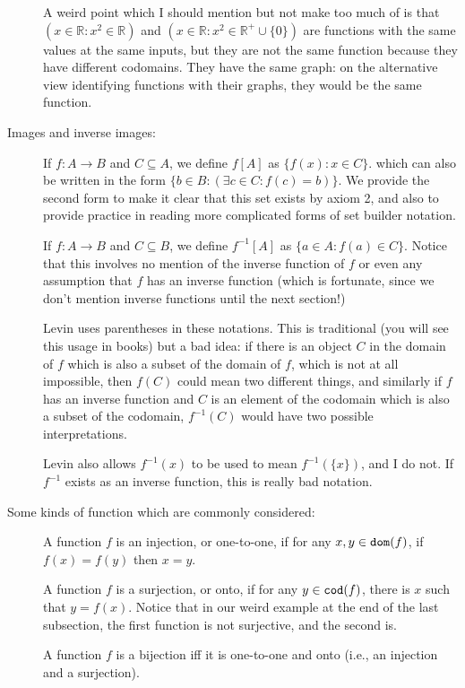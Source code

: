 \documentclass[12pt]{article}
\begin{document}
\begin{description}
A weird point which I should mention but not make too much of is that $(x \in {\mathbb R}:x^2 \in \mathbb R)$ and $(x \in {\mathbb R}:x^2 \in \mathbb R^+ \cup \{0\})$ are functions with the same values at the same inputs, but they are not the same function because they have different codomains.  They have the same graph:  on the alternative view identifying functions with their graphs, they would be the same function.


\item[Images and inverse images:]

If $f:A \rightarrow B$ and $C \subseteq A$, we define $f[A]$ as $\{f(x):x \in C\}$. which can also be written in the form $\{b \in B:(\exists c \in C:f(c)=b)\}$.  We provide the second form to make it clear
that this set exists by axiom 2, and also to provide practice in reading more complicated forms of set builder notation.

If $f:A \rightarrow B$ and $C \subseteq B$, we define $f^{-1}[A]$ as $\{a \in A:f(a) \in C\}$.  Notice that this involves no mention of the inverse function of $f$ or even any assumption that $f$ has an inverse function (which is fortunate, since we don't mention inverse functions until the next section!)

Levin uses parentheses in these notations.  This is traditional (you will see this usage in books) but a bad idea:  if there is an object $C$ in the domain of $f$ which is also a subset of the domain of $f$, which is not at all impossible,
then $f(C)$ could mean two different things, and similarly if $f$ has an inverse function and $C$ is an element of the codomain which is also a subset of the codomain, $f^{-1}(C)$ would have two possible interpretations.

Levin also allows $f^{-1}(x)$ to be used to mean $f^{-1}(\{x\})$, and I do not.  If $f^{-1}$ exists as an inverse function, this is really bad notation.


\item[Some kinds of function which are commonly considered:]

A function $f$ is an injection, or one-to-one, if for any $x,y \in {\tt dom}(f)$, if $f(x)=f(y)$ then $x=y$.

A function $f$ is a surjection, or onto, if for any $y \in {\tt cod}(f)$, there is $x$ such that $y = f(x)$.  Notice that in our weird example at the end of the last subsection, the first function is not surjective, and the second is.

A function $f$ is a bijection iff it is one-to-one and onto (i.e., an injection and a surjection).


\end{description}
\end{document}
